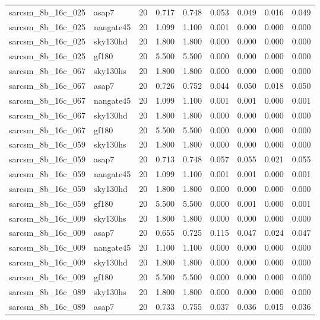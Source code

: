 \begin{tabular}{llrrrrrrr}
sarcsm\_8b\_16c\_025 & asap7 & 20 & 0.717 & 0.748 & 0.053 & 0.049 & 0.016 & 0.049 \\
sarcsm\_8b\_16c\_025 & nangate45 & 20 & 1.099 & 1.100 & 0.001 & 0.000 & 0.000 & 0.000 \\
sarcsm\_8b\_16c\_025 & sky130hd & 20 & 1.800 & 1.800 & 0.000 & 0.000 & 0.000 & 0.000 \\
sarcsm\_8b\_16c\_025 & gf180 & 20 & 5.500 & 5.500 & 0.000 & 0.000 & 0.000 & 0.000 \\
sarcsm\_8b\_16c\_067 & sky130hs & 20 & 1.800 & 1.800 & 0.000 & 0.000 & 0.000 & 0.000 \\
sarcsm\_8b\_16c\_067 & asap7 & 20 & 0.726 & 0.752 & 0.044 & 0.050 & 0.018 & 0.050 \\
sarcsm\_8b\_16c\_067 & nangate45 & 20 & 1.099 & 1.100 & 0.001 & 0.001 & 0.000 & 0.001 \\
sarcsm\_8b\_16c\_067 & sky130hd & 20 & 1.800 & 1.800 & 0.000 & 0.000 & 0.000 & 0.000 \\
sarcsm\_8b\_16c\_067 & gf180 & 20 & 5.500 & 5.500 & 0.000 & 0.000 & 0.000 & 0.000 \\
sarcsm\_8b\_16c\_059 & sky130hs & 20 & 1.800 & 1.800 & 0.000 & 0.000 & 0.000 & 0.000 \\
sarcsm\_8b\_16c\_059 & asap7 & 20 & 0.713 & 0.748 & 0.057 & 0.055 & 0.021 & 0.055 \\
sarcsm\_8b\_16c\_059 & nangate45 & 20 & 1.099 & 1.100 & 0.001 & 0.001 & 0.000 & 0.001 \\
sarcsm\_8b\_16c\_059 & sky130hd & 20 & 1.800 & 1.800 & 0.000 & 0.000 & 0.000 & 0.000 \\
sarcsm\_8b\_16c\_059 & gf180 & 20 & 5.500 & 5.500 & 0.000 & 0.001 & 0.000 & 0.001 \\
sarcsm\_8b\_16c\_009 & sky130hs & 20 & 1.800 & 1.800 & 0.000 & 0.000 & 0.000 & 0.000 \\
sarcsm\_8b\_16c\_009 & asap7 & 20 & 0.655 & 0.725 & 0.115 & 0.047 & 0.024 & 0.047 \\
sarcsm\_8b\_16c\_009 & nangate45 & 20 & 1.100 & 1.100 & 0.000 & 0.000 & 0.000 & 0.000 \\
sarcsm\_8b\_16c\_009 & sky130hd & 20 & 1.800 & 1.800 & 0.000 & 0.000 & 0.000 & 0.000 \\
sarcsm\_8b\_16c\_009 & gf180 & 20 & 5.500 & 5.500 & 0.000 & 0.000 & 0.000 & 0.000 \\
sarcsm\_8b\_16c\_089 & sky130hs & 20 & 1.800 & 1.800 & 0.000 & 0.000 & 0.000 & 0.000 \\
sarcsm\_8b\_16c\_089 & asap7 & 20 & 0.733 & 0.755 & 0.037 & 0.036 & 0.015 & 0.036 \\

\end{tabular}
